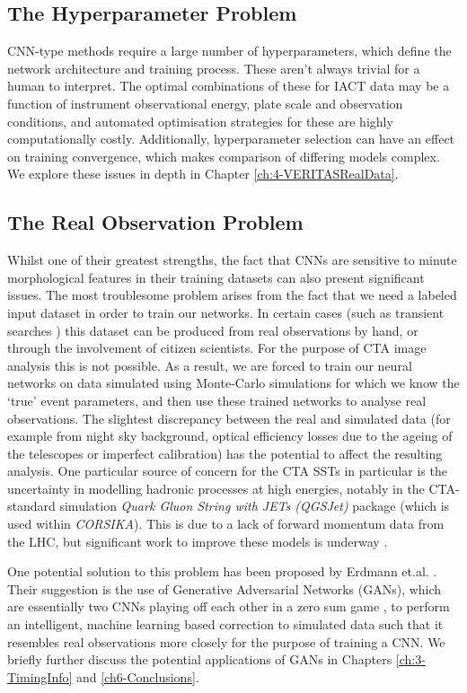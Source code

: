 \subsection{The Hyperparameter Problem}
CNN-type methods require a large number of hyperparameters, which define the network architecture and training process. These aren't always trivial for a human to interpret. The optimal combinations of these for IACT data may be a function of instrument observational energy, plate scale and observation conditions, and automated optimisation strategies for these are highly computationally costly. Additionally, hyperparameter selection can have an effect on training convergence, which makes comparison of differing models complex. We explore these issues in depth in Chapter \ref{ch:4-VERITASRealData}.

\subsection{The Real Observation Problem}
Whilst one of their greatest strengths, the fact that CNNs are sensitive to minute morphological features in their training datasets can also present significant issues. The most troublesome problem arises from the fact that we need a labeled input dataset in order to train our networks. In certain cases (such as transient searches \cite{SNH}) this dataset can be produced from real observations by hand, or through the involvement of citizen scientists. For the purpose of CTA image analysis this is not possible. As a result, we are forced to train our neural networks on data simulated using Monte-Carlo simulations for which we know the `true' event parameters, and then use these trained networks to analyse real observations. The slightest discrepancy between the real and simulated data (for example from night sky background, optical efficiency losses due to the ageing of the telescopes or imperfect calibration) has the potential to affect the resulting analysis. One particular source of concern for the CTA SSTs in particular is the uncertainty in modelling hadronic processes at high energies, notably in the CTA-standard simulation \textit{Quark Gluon String with JETs (QGSJet)} package (which is used within \textit{CORSIKA}). This is due to a lack of forward momentum data from the LHC, but significant work to improve these models is underway \cite{hadronmodel}.

One potential solution to this problem has been proposed by Erdmann et.al. \cite{ErdmannAuger}. Their suggestion is the use of Generative Adversarial Networks (GANs), which are essentially two CNNs playing off each other in a zero sum game \cite{goodfellow2016deep}, to perform an intelligent, machine learning based correction to simulated data such that it resembles real observations more closely for the purpose of training a CNN. We briefly further discuss the potential applications of GANs in Chapters \ref{ch:3-TimingInfo} and \ref{ch6-Conclusions}.

